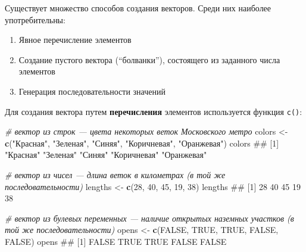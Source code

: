 \documentclass[]{book}
\newenvironment{Shaded}{\begin{snugshade}}{\end{snugshade}}
\newcommand{\KeywordTok}[1]{\textcolor[rgb]{0.13,0.29,0.53}{\textbf{#1}}}
\newcommand{\DecValTok}[1]{\textcolor[rgb]{0.00,0.00,0.81}{#1}}
\newcommand{\StringTok}[1]{\textcolor[rgb]{0.31,0.60,0.02}{#1}}
\newcommand{\CommentTok}[1]{\textcolor[rgb]{0.56,0.35,0.01}{\textit{#1}}}
\newcommand{\OtherTok}[1]{\textcolor[rgb]{0.56,0.35,0.01}{#1}}
\newcommand{\NormalTok}[1]{#1}
\providecommand{\tightlist}{%
  \setlength{\itemsep}{0pt}\setlength{\parskip}{0pt}}
\begin{document}
Существует множество способов создания векторов. Среди них наиболее
употребительны:

\begin{enumerate}
\def\labelenumi{\arabic{enumi}.}
\tightlist
\item
  Явное перечисление элементов
\item
  Создание пустого вектора (``болванки''), состоящего из заданного числа
  элементов
\item
  Генерация последовательности значений
\end{enumerate}

Для создания вектора путем \textbf{перечисления} элементов используется
функция \texttt{c()}:

\begin{Shaded}
\begin{Highlighting}[]
\CommentTok{# вектор из строк — цвета некоторых веток Московского метро}
\NormalTok{colors <-}\StringTok{ }\KeywordTok{c}\NormalTok{(}\StringTok{"Красная"}\NormalTok{, }\StringTok{"Зеленая"}\NormalTok{, }\StringTok{"Синяя"}\NormalTok{, }\StringTok{"Коричневая"}\NormalTok{, }\StringTok{"Оранжевая"}\NormalTok{)}
\NormalTok{colors}
\NormalTok{## [1] "Красная"    "Зеленая"    "Синяя"      "Коричневая" "Оранжевая"}
\end{Highlighting}
\end{Shaded}

\begin{Shaded}
\begin{Highlighting}[]
\CommentTok{# вектор из чисел — длина веток в километрах (в той же последовательности)}
\NormalTok{lengths <-}\StringTok{ }\KeywordTok{c}\NormalTok{(}\DecValTok{28}\NormalTok{, }\DecValTok{40}\NormalTok{, }\DecValTok{45}\NormalTok{, }\DecValTok{19}\NormalTok{, }\DecValTok{38}\NormalTok{)}
\NormalTok{lengths}
\NormalTok{## [1] 28 40 45 19 38}
\end{Highlighting}
\end{Shaded}

\begin{Shaded}
\begin{Highlighting}[]
\CommentTok{# вектор из булевых переменных — наличие  открытых наземных участков (в той же последовательности)}
\NormalTok{opens <-}\StringTok{ }\KeywordTok{c}\NormalTok{(}\OtherTok{FALSE}\NormalTok{, }\OtherTok{TRUE}\NormalTok{, }\OtherTok{TRUE}\NormalTok{, }\OtherTok{FALSE}\NormalTok{, }\OtherTok{FALSE}\NormalTok{)}
\NormalTok{opens}
\NormalTok{## [1] FALSE  TRUE  TRUE FALSE FALSE}
\end{Highlighting}
\end{Shaded}
\end{document}
